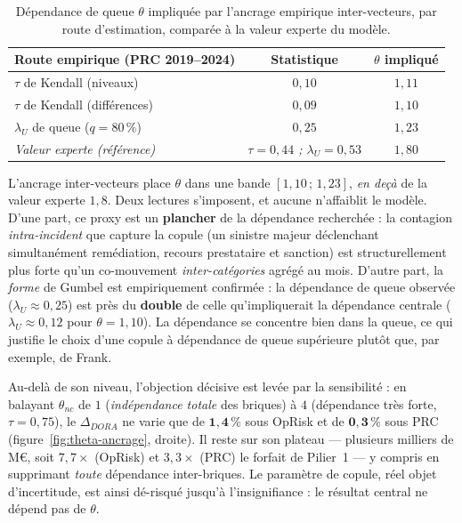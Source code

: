 \documentclass[11pt,a4paper]{article}
\theoremstyle{navystyle}
\theoremstyle{navydef}
\begin{document}
\begin{table}[h]
\centering
\setlength{\tabcolsep}{6pt}
\renewcommand{\arraystretch}{1.25}
\begin{tabular}{>{\raggedright}p{6.3cm} c c}
\toprule
\rowcolor{lightblue}
\textbf{Route empirique (PRC 2019--2024)} & \textbf{Statistique} & \textbf{$\theta$ impliqué} \\
\midrule
$\tau$ de Kendall (niveaux)              & $0{,}10$ & $1{,}11$ \\
$\tau$ de Kendall (différences)         & $0{,}09$ & $1{,}10$ \\
$\lambda_U$ de queue ($q=80\,\%$)       & $0{,}25$ & $1{,}23$ \\
\midrule
\emph{Valeur experte (référence)}       & \emph{$\tau=0{,}44$ ; $\lambda_U=0{,}53$} & \emph{$1{,}80$} \\
\bottomrule
\end{tabular}
\caption{Dépendance de queue $\theta$ impliquée par l'ancrage empirique inter-vecteurs, par route d'estimation, comparée à la valeur experte du modèle.}
\label{tab:theta-ancrage}
\end{table}

L'ancrage inter-vecteurs place $\theta$ dans une bande $[1{,}10\,;\,1{,}23]$, \emph{en deçà} de la valeur experte $1{,}8$. Deux lectures s'imposent, et aucune n'affaiblit le modèle. D'une part, ce proxy est un \textbf{plancher} de la dépendance recherchée : la contagion \emph{intra-incident} que capture la copule (un sinistre majeur déclenchant simultanément remédiation, recours prestataire et sanction) est structurellement plus forte qu'un co-mouvement \emph{inter-catégories} agrégé au mois. D'autre part, la \emph{forme} de Gumbel est empiriquement confirmée : la dépendance de queue observée ($\lambda_U\approx0{,}25$) est près du \textbf{double} de celle qu'impliquerait la dépendance centrale ($\lambda_U\approx0{,}12$ pour $\theta=1{,}10$). La dépendance se concentre bien dans la queue, ce qui justifie le choix d'une copule à dépendance de queue supérieure plutôt que, par exemple, de Frank.

\begin{formulekey}
Au-delà de son niveau, l'objection décisive est levée par la sensibilité : en balayant $\theta_{nc}$ de $1$ (\emph{indépendance totale} des briques) à $4$ (dépendance très forte, $\tau=0{,}75$), le $\Delta_{DORA}$ ne varie que de $\mathbf{1{,}4\,\%}$ sous OpRisk et de $\mathbf{0{,}3\,\%}$ sous PRC (figure~\ref{fig:theta-ancrage}, droite). Il reste sur son plateau --- plusieurs milliers de M\euro, soit $7{,}7\times$ (OpRisk) et $3{,}3\times$ (PRC) le forfait de Pilier~1 --- y compris en supprimant \emph{toute} dépendance inter-briques. Le paramètre de copule, réel objet d'incertitude, est ainsi dé-risqué jusqu'à l'insignifiance : le résultat central ne dépend pas de $\theta$.
\end{formulekey}
\end{document}
